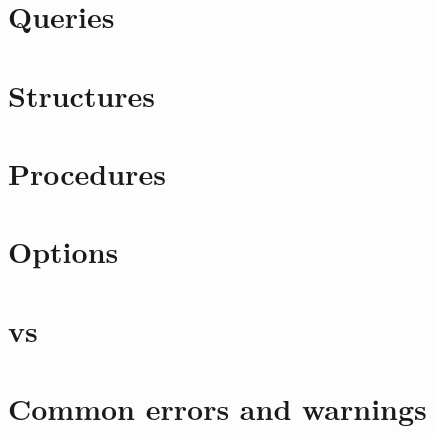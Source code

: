 \documentclass[a4]{article}
\begin{document}
\section{Queries}


\section{Structures}


\section{Procedures}


\section{Options}


\section{\idptwo vs \idpthree}


\section{Common errors and warnings}

\end{document}
